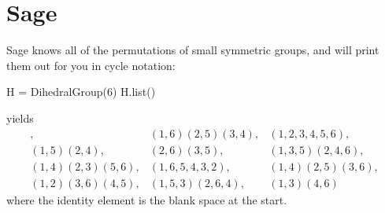 \section{Sage}
Sage knows all of the permutations of small symmetric groups, and will print them out for you in cycle notation:
\begin{sageblock}
H = DihedralGroup(6)
H.list()
\end{sageblock}
yields
\[
\begin{array}{lll}
               , & (1,6)(2,5)(3,4), & (1,2,3,4,5,6), \\ 
     (1,5)(2,4), & (2,6)(3,5),      & (1,3,5)(2,4,6), \\ 
(1,4)(2,3)(5,6), & (1,6,5,4,3,2),   & (1,4)(2,5)(3,6), \\ 
(1,2)(3,6)(4,5), & (1,5,3)(2,6,4),  & (1,3)(4,6)
\end{array}
\]
where the identity element is the blank space at the start.
